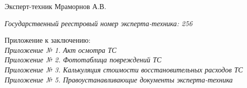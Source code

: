    
    
    
\vspace{10mm}

 \noindent Эксперт-техник   \hfill        Мраморнов А.В.
 
\vspace{1mm}
\noindent   \textit{  Государственный  реестровый номер эксперта-техника:   256}\\

\vspace{15mm}

\relax
\noindent Приложение к заключению:\\
\textit{
    Приложение № 1. Акт осмотра ТС \\
    Приложение № 2. Фототаблица повреждений ТС\\
	Приложение № 3. Калькуляция стоимости восстановительных расходов ТС \\
	Приложение № 5. Правоустанавливающие документы эксперта-техника\\
}

%
%